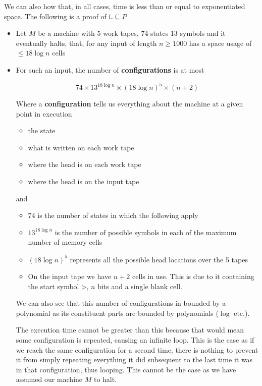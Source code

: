 \documentclass{article}
\begin{document}
  We can also how that, in all cases, time is less than or equal to exponentiated space.
  The following is a proof of $\texttt{L} \subseteq P $

  \begin{itemize}
    \item Let $M$ be a machine with 5 work tapes, 74 states 13 symbols and it eventually halts, that, for any input of length $n\geq 1000$ has a space usage of $\leq 18\log n$ cells

    \item For such an input, the number of \textbf{configurations} is at most

          \[
          74 \times 13^{18\log n} \times (18\log n)^{5}\times (n+2)
          \]

          Where a \textbf{configuration} tells us everything about the machine at a given point in execution
          \begin{itemize}
            \item the state
            \item what is written on each work tape
            \item where the head is on each work tape
            \item where the head is on the input tape
          \end{itemize}

          and

          \begin{itemize}
            \item 74 is the number of states in which the following apply
            \item $13^{18\log n}$ is the number of possible symbols in each of the maximum number of memory cells
            \item $(18\log n)^{5}$ represents all the possible head locations over the 5 tapes
            \item On the input tape we have $n+2$ cells in use. This is due to it containing the start symbol $\rhd$, $n$ bits and a single blank cell.
          \end{itemize}

          We can also see that this number of configurations in bounded by a polynomial as its constituent parts are bounded by polynomials ($\log$ etc.).

          The execution time cannot be greater than this because that would mean some configuration is repeated, causing an infinite loop. This is the case as if we reach the same configuration for a second time, there is nothing to prevent it from simply repeating everything it did subsequent to the last time it was in that configuration, thus looping. This cannot be the case as we have assumed our machine $M$ to halt.

  \end{itemize}
\end{document}
